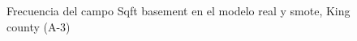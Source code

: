 \begin{figure}[H]
    \centering
    
    \caption{Frecuencia del campo Sqft basement en el modelo real y smote, King county (A-3)}
    \label{frecuency-smote-sqft basement}
\end{figure}